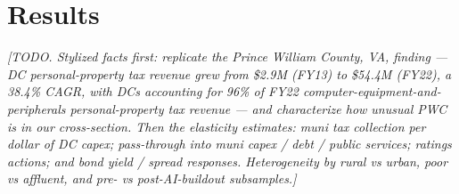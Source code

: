 \section{Results}\label{sec:results}

\noindent\textit{[TODO. Stylized facts first: replicate the Prince William County, VA, finding — DC personal-property tax revenue grew from \$2.9M (FY13) to \$54.4M (FY22), a 38.4\% CAGR, with DCs accounting for 96\% of FY22 computer-equipment-and-peripherals personal-property tax revenue \citep{pwc2022_fiscal_impact} — and characterize how unusual PWC is in our cross-section. Then the elasticity estimates: muni tax collection per dollar of DC capex; pass-through into muni capex / debt / public services; ratings actions; and bond yield / spread responses. Heterogeneity by rural vs urban, poor vs affluent, and pre- vs post-AI-buildout subsamples.]}

